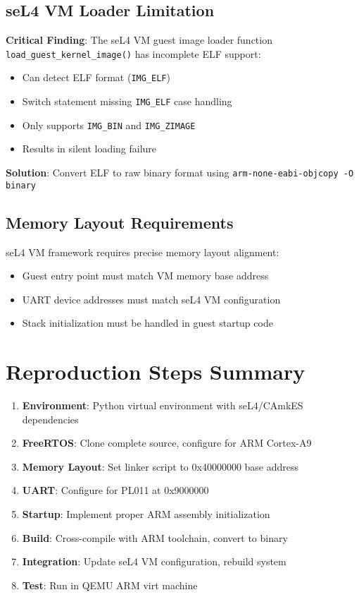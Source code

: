 \documentclass[12pt]{article}
\begin{document}
\subsection{seL4 VM Loader Limitation}

\textbf{Critical Finding}: The seL4 VM guest image loader function \texttt{load\_guest\_kernel\_image()} has incomplete ELF support:

\begin{itemize}
\item Can detect ELF format (\texttt{IMG\_ELF})
\item Switch statement missing \texttt{IMG\_ELF} case handling
\item Only supports \texttt{IMG\_BIN} and \texttt{IMG\_ZIMAGE}  
\item Results in silent loading failure
\end{itemize}

\textbf{Solution}: Convert ELF to raw binary format using \texttt{arm-none-eabi-objcopy -O binary}

\subsection{Memory Layout Requirements}

seL4 VM framework requires precise memory layout alignment:
\begin{itemize}
\item Guest entry point must match VM memory base address
\item UART device addresses must match seL4 VM configuration
\item Stack initialization must be handled in guest startup code
\end{itemize}

\section{Reproduction Steps Summary}

\begin{enumerate}
\item \textbf{Environment}: Python virtual environment with seL4/CAmkES dependencies
\item \textbf{FreeRTOS}: Clone complete source, configure for ARM Cortex-A9
\item \textbf{Memory Layout}: Set linker script to 0x40000000 base address
\item \textbf{UART}: Configure for PL011 at 0x9000000
\item \textbf{Startup}: Implement proper ARM assembly initialization  
\item \textbf{Build}: Cross-compile with ARM toolchain, convert to binary
\item \textbf{Integration}: Update seL4 VM configuration, rebuild system
\item \textbf{Test}: Run in QEMU ARM virt machine
\end{enumerate}
\end{document}
